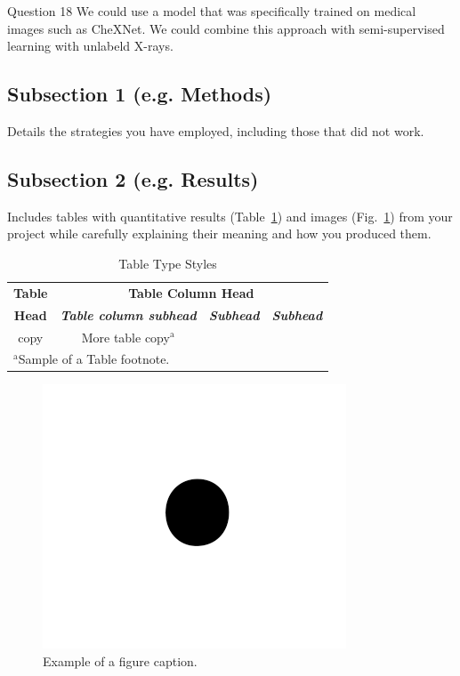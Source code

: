 \documentclass[conference]{IEEEtran}
\begin{document}
Question 18
We could use a model that was specifically trained on medical images such as CheXNet.
We could combine this approach with semi-supervised learning with unlabeld X-rays.

\subsection{Subsection 1 (e.g. Methods)}
 Details the strategies you have employed, including those that did not work.

\subsection{Subsection 2 (e.g. Results)}
Includes tables with quantitative results (Table~\ref{table:example}) and images (Fig.~\ref{fig:example}) from your project while carefully explaining their meaning and how you produced them.
\begin{table}[htbp]
\caption{Table Type Styles}
\begin{center}
\begin{tabular}{|c|c|c|c|}
\hline
\textbf{Table}&\multicolumn{3}{|c|}{\textbf{Table Column Head}} \\
\cline{2-4} 
\textbf{Head} & \textbf{\textit{Table column subhead}}& \textbf{\textit{Subhead}}& \textbf{\textit{Subhead}} \\
\hline
copy& More table copy$^{\mathrm{a}}$& &  \\
\hline
\multicolumn{4}{l}{$^{\mathrm{a}}$Sample of a Table footnote.}
\end{tabular}
\label{table:example}
\end{center}
\end{table}

\begin{figure}[htbp]
\centerline{\includegraphics{fig1.png}}
\caption{Example of a figure caption.}
\label{fig:example}
\end{figure}
\end{document}

